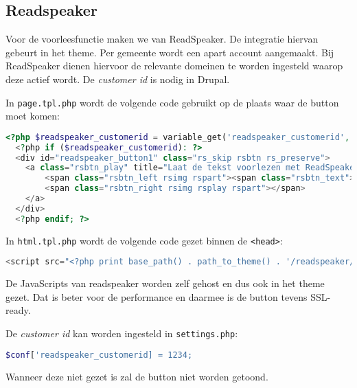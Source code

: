 \subsection{Readspeaker}\label{readspeaker}

Voor de voorleesfunctie maken we van ReadSpeaker. De integratie hiervan gebeurt in het theme. Per gemeente wordt een apart account aangemaakt. Bij ReadSpeaker dienen hiervoor de relevante domeinen te worden ingesteld waarop deze actief wordt. De \emph{customer id} is nodig in Drupal.

In \texttt{page.tpl.php} wordt de volgende code gebruikt op de plaats waar de button moet komen:

\begin{lstlisting}[language=PHP]
  <?php $readspeaker_customerid = variable_get('readspeaker_customerid', 0); ?>
  <?php if ($readspeaker_customerid): ?>
  <div id="readspeaker_button1" class="rs_skip rsbtn rs_preserve">
    <a class="rsbtn_play" title="Laat de tekst voorlezen met ReadSpeaker" href="//app.eu.readspeaker.com/cgi-bin/rsent?customerid=<?php print $readspeaker_customerid; ?>&amp;lang=nl_nl&amp;readid=main&amp;url=<?php echo urlencode($_SERVER['HTTP_HOST'] . $_SERVER['REQUEST_URI']); ?>">
        <span class="rsbtn_left rsimg rspart"><span class="rsbtn_text"><span>Lees voor</span></span></span>
        <span class="rsbtn_right rsimg rsplay rspart"></span>
    </a>
  </div>
  <?php endif; ?>
\end{lstlisting}

In \texttt{html.tpl.php} wordt de volgende code gezet binnen de \texttt{\textless head\textgreater}:
\begin{lstlisting}[language=PHP]
<script src="<?php print base_path() . path_to_theme() . '/readspeaker/ReadSpeaker.js?pids=embhl'; ?>"></script>
\end{lstlisting}

De JavaScripts van readspeaker worden zelf gehost en dus ook in het theme gezet. Dat is beter voor de performance en daarmee is de button tevens SSL-ready.

De \emph{customer id} kan worden ingesteld in \texttt{settings.php}:
\begin{lstlisting}[language=PHP]
$conf['readspeaker_customerid] = 1234;
\end{lstlisting}

Wanneer deze niet gezet is zal de button niet worden getoond.